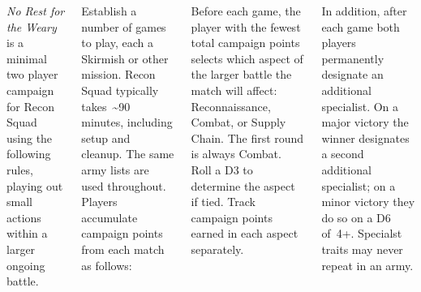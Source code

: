 
\begin{columns}

  \emph{No Rest for the Weary} is a minimal two player campaign for
  Recon Squad using the following rules, playing out small actions
  within a larger ongoing battle.

  Establish a number of games to play, each a Skirmish or other
  mission.  Recon Squad typically takes~\textasciitilde 90 minutes,
  including setup and cleanup.  The same army lists are used
  throughout.  Players accumulate campaign points from each match as
  follows:

\bigskip\centerline{}

\bigskip Before each game, the player with the fewest total campaign
points selects which aspect of the larger battle the match will
affect: Reconnaissance, Combat, or Supply Chain.  The first round is
always Combat.  Roll a D3 to determine the aspect if tied.  Track
campaign points earned in each aspect separately.

In addition, after each game both players permanently designate an
additional specialist.  On a major victory the winner designates a
second additional specialist; on a minor victory they do so on a D6
of~4+.  Specialst traits may never repeat in an army.





\end{columns}
